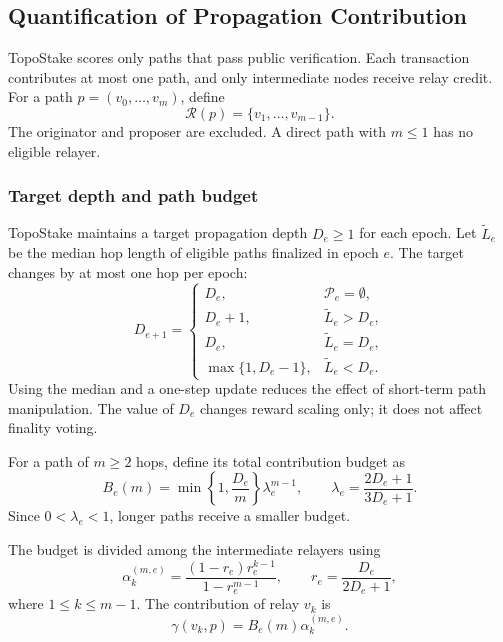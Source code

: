 \documentclass[lettersize,journal]{IEEEtran}
\begin{document}
\subsection{Quantification of Propagation Contribution}
\label{subsec:contribution-quantification}

TopoStake scores only paths that pass public verification.
Each transaction contributes at most one path, and only intermediate nodes receive relay credit.
For a path $p=(v_0,\dots,v_m)$, define
\begin{equation}
\label{eq:relay_set}
\mathcal{R}(p)
=
\{v_1,\dots,v_{m-1}\}.
\end{equation}
The originator and proposer are excluded.
A direct path with $m\leq1$ has no eligible relayer.

\subsubsection{Target depth and path budget}
TopoStake maintains a target propagation depth $D_e\geq1$ for each epoch.
Let $\widetilde L_e$ be the median hop length of eligible paths finalized in epoch $e$.
The target changes by at most one hop per epoch:
\begin{equation}
\label{eq:target_update}
D_{e+1}
=
\begin{cases}
D_e, & \mathcal{P}_e=\emptyset,\\
D_e+1, & \widetilde L_e>D_e,\\
D_e, & \widetilde L_e=D_e,\\
\max\{1,D_e-1\}, & \widetilde L_e<D_e.
\end{cases}
\end{equation}
Using the median and a one-step update reduces the effect of short-term path manipulation.
The value of $D_e$ changes reward scaling only; it does not affect finality voting.

For a path of $m\geq2$ hops, define its total contribution budget as
\begin{equation}
\label{eq:path_budget_def}
B_e(m)
=
\min\left\{1,\frac{D_e}{m}\right\}
\lambda_e^{m-1},
\qquad
\lambda_e
=
\frac{2D_e+1}{3D_e+1}.
\end{equation}
Since $0<\lambda_e<1$, longer paths receive a smaller budget.

The budget is divided among the intermediate relayers using
\begin{equation}
\label{eq:position_weight}
\alpha_k^{(m,e)}
=
\frac{(1-r_e)r_e^{k-1}}
{1-r_e^{m-1}},
\qquad
r_e
=
\frac{D_e}{2D_e+1},
\end{equation}
where $1\leq k\leq m-1$.
The contribution of relay $v_k$ is
\begin{equation}
\label{eq:atomic_credit}
\gamma(v_k,p)
=
B_e(m)\alpha_k^{(m,e)}.
\end{equation}
\end{document}
